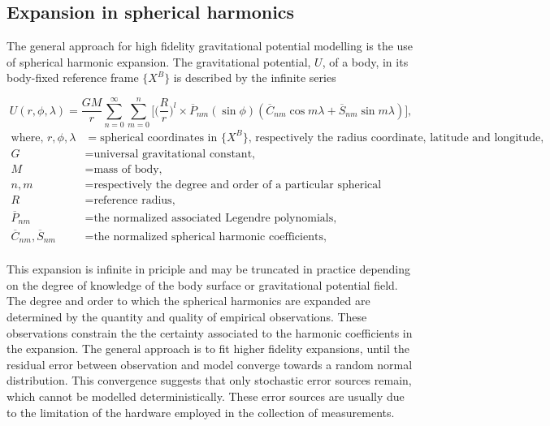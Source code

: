 \subsection{Expansion in spherical harmonics}

The general approach for high fidelity gravitational potential modelling is the
use of spherical harmonic expansion. The gravitational potential, $U$, of a
body, in its body-fixed reference frame $\{X^B\}$ is described by the infinite
series

\begin{equation}
    U(r,\phi,\lambda) = \frac{GM}{r}\sum_{n=0}^\infty{}\sum_{m=0}^n{}\bigg[\bigg(\frac{R}{r}\bigg)^l\times{}\overline{P}_{nm}(\sin{\phi})(\overline{C}_{nm}\cos{m\lambda}+\overline{S}_{nm}\sin{m\lambda})\bigg],
    \label{eq:grav_sh}
\end{equation}
\begin{equation*}
    \begin{aligned}
        \textrm{where, }
        r, \phi, \lambda &= \textrm{spherical coordinates in $\{X^B\}$, respectively the radius coordinate, latitude and longitude,} \\
        G &= \textrm{universal gravitational constant,} \\
        M &= \textrm{mass of body,} \\
        n, m &= \textrm{respectively the degree and order of a particular spherical harmonic,} \\
        R &= \textrm{reference radius,} \\
        \overline{P}_{nm} &= \textrm{the normalized associated Legendre polynomials,} \\
        \overline{C}_{nm}, \overline{S}_{nm} &= \textrm{the normalized spherical harmonic coefficients,} \\
    \end{aligned}
\end{equation*}

This expansion is infinite in priciple and may be truncated in practice
depending on the degree of knowledge of the body surface or gravitational
potential field. The degree and order to which the spherical harmonics are
expanded are determined by the quantity and quality of empirical observations.
These observations constrain the the certainty associated to the harmonic
coefficients in the expansion. The general approach is to fit higher fidelity
expansions, until the residual error between observation and model converge
towards a random normal distribution. This convergence suggests that only
stochastic error sources remain, which cannot be modelled deterministically.
These error sources are usually due to the limitation of the hardware employed
in the collection of measurements.

